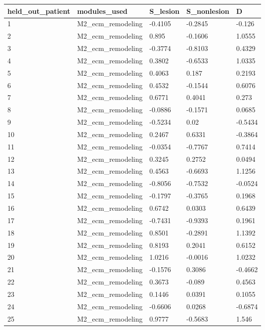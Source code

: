 \begin{longtable}{lllll}
\hline\hline
held\_out\_patient & modules\_used & S\_lesion & S\_nonlesion & D \\
\hline\endhead
1 & M2\_ecm\_remodeling & -0.4105 & -0.2845 & -0.126 \\
2 & M2\_ecm\_remodeling & 0.895 & -0.1606 & 1.0555 \\
3 & M2\_ecm\_remodeling & -0.3774 & -0.8103 & 0.4329 \\
4 & M2\_ecm\_remodeling & 0.3802 & -0.6533 & 1.0335 \\
5 & M2\_ecm\_remodeling & 0.4063 & 0.187 & 0.2193 \\
6 & M2\_ecm\_remodeling & 0.4532 & -0.1544 & 0.6076 \\
7 & M2\_ecm\_remodeling & 0.6771 & 0.4041 & 0.273 \\
8 & M2\_ecm\_remodeling & -0.0886 & -0.1571 & 0.0685 \\
9 & M2\_ecm\_remodeling & -0.5234 & 0.02 & -0.5434 \\
10 & M2\_ecm\_remodeling & 0.2467 & 0.6331 & -0.3864 \\
11 & M2\_ecm\_remodeling & -0.0354 & -0.7767 & 0.7414 \\
12 & M2\_ecm\_remodeling & 0.3245 & 0.2752 & 0.0494 \\
13 & M2\_ecm\_remodeling & 0.4563 & -0.6693 & 1.1256 \\
14 & M2\_ecm\_remodeling & -0.8056 & -0.7532 & -0.0524 \\
15 & M2\_ecm\_remodeling & -0.1797 & -0.3765 & 0.1968 \\
16 & M2\_ecm\_remodeling & 0.6742 & 0.0303 & 0.6439 \\
17 & M2\_ecm\_remodeling & -0.7431 & -0.9393 & 0.1961 \\
18 & M2\_ecm\_remodeling & 0.8501 & -0.2891 & 1.1392 \\
19 & M2\_ecm\_remodeling & 0.8193 & 0.2041 & 0.6152 \\
20 & M2\_ecm\_remodeling & 1.0216 & -0.0016 & 1.0232 \\
21 & M2\_ecm\_remodeling & -0.1576 & 0.3086 & -0.4662 \\
22 & M2\_ecm\_remodeling & 0.3673 & -0.089 & 0.4563 \\
23 & M2\_ecm\_remodeling & 0.1446 & 0.0391 & 0.1055 \\
24 & M2\_ecm\_remodeling & -0.6606 & 0.0268 & -0.6874 \\
25 & M2\_ecm\_remodeling & 0.9777 & -0.5683 & 1.546 \\
\hline\hline\end{longtable}
